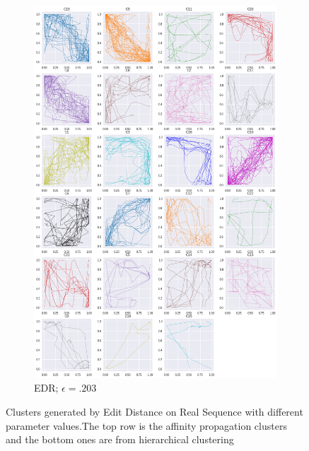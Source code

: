 \begin{figure}[h]
\begin{subfigure}[c]{0.35\linewidth}
      \includegraphics[width=\linewidth]{figs/clusters/CLU_H_ALL[EDR;e=.203].png}
    \caption{EDR; $\epsilon=.203$}
  \end{subfigure}
  \hspace{.5em}
 
  \caption{Clusters generated by Edit Distance on Real Sequence with different parameter values.The top row is the affinity propagation clusters and the bottom ones are from hierarchical clustering}
  \label{fig:cluster-edr}
\end{figure}



